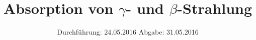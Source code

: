 

\subject{V704}
\title{Absorption von $γ$- und $β$-Strahlung}
\date{
  Durchführung: 24.05.2016
  \hspace{3em}
  Abgabe: 31.05.2016
}



\maketitle
\thispagestyle{empty}
\tableofcontents
\newpage







\printbibliography


